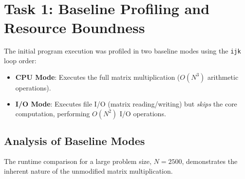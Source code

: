 \documentclass[11pt, a4paper]{article}
\begin{document}
\section{Task 1: Baseline Profiling and Resource Boundness}

The initial program execution was profiled in two baseline modes using the \texttt{ijk} loop order:
\begin{itemize}
    \item \textbf{CPU Mode}: Executes the full matrix multiplication ($O(N^3)$ arithmetic operations).
    \item \textbf{I/O Mode}: Executes file I/O (matrix reading/writing) but \emph{skips} the core computation, performing $O(N^2)$ I/O operations.
\end{itemize}

\subsection{Analysis of Baseline Modes}

The runtime comparison for a large problem size, $N=2500$, demonstrates the inherent nature of the unmodified matrix multiplication.
\end{document}
